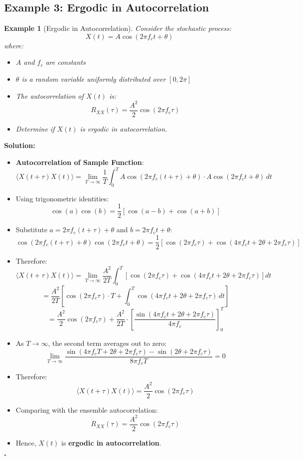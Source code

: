 \documentclass[12pt]{article}
\newtheorem{example}{Example}
\newenvironment{solution}{\noindent\textbf{Solution:}}{\hfill$\square$}
\begin{document}
\subsection{Example 3: Ergodic in Autocorrelation}
\begin{example}[Ergodic in Autocorrelation]
Consider the stochastic process:
\[
X(t) = A \cos(2\pi f_c t + \theta)
\]
where:
\begin{itemize}
    \item \( A \) and \( f_c \) are constants
    \item \( \theta \) is a random variable uniformly distributed over \( [0, 2\pi] \)
\end{itemize}
\begin{itemize}
    \item The autocorrelation of \( X(t) \) is:
    \[
    R_{XX}(\tau) = \frac{A^2}{2} \cos(2\pi f_c \tau)
    \]
    \item Determine if \( X(t) \) is ergodic in autocorrelation.
\end{itemize}
\end{example}
\begin{solution}
\begin{itemize}
    \item \textbf{Autocorrelation of Sample Function}:
    \[
    \langle X(t+\tau) X(t) \rangle = \lim_{T \to \infty} \frac{1}{T} \int_{0}^{T} A \cos(2\pi f_c (t+\tau) + \theta) \cdot A \cos(2\pi f_c t + \theta) \, dt
    \]
    \item Using trigonometric identities:
    \[
    \cos(a)\cos(b) = \frac{1}{2} [\cos(a - b) + \cos(a + b)]
    \]
    \item Substitute \( a = 2\pi f_c (t+\tau) + \theta \) and \( b = 2\pi f_c t + \theta \):
    \[
    \cos(2\pi f_c (t+\tau) + \theta) \cos(2\pi f_c t + \theta) = \frac{1}{2} \left[ \cos(2\pi f_c \tau) + \cos(4\pi f_c t + 2\theta + 2\pi f_c \tau) \right]
    \]
    \item Therefore:
    \[
    \langle X(t+\tau) X(t) \rangle = \lim_{T \to \infty} \frac{A^2}{2T} \int_{0}^{T} \left[ \cos(2\pi f_c \tau) + \cos(4\pi f_c t + 2\theta + 2\pi f_c \tau) \right] dt
    \]
    \[
    = \frac{A^2}{2T} \left[ \cos(2\pi f_c \tau) \cdot T + \int_{0}^{T} \cos(4\pi f_c t + 2\theta + 2\pi f_c \tau) \, dt \right]
    \]
    \[
    = \frac{A^2}{2} \cos(2\pi f_c \tau) + \frac{A^2}{2T} \cdot \left[ \frac{\sin(4\pi f_c t + 2\theta + 2\pi f_c \tau)}{4\pi f_c} \right]_{0}^{T}
    \]
    \item As \( T \to \infty \), the second term averages out to zero:
    \[
    \lim_{T \to \infty} \frac{\sin(4\pi f_c T + 2\theta + 2\pi f_c \tau) - \sin(2\theta + 2\pi f_c \tau)}{8\pi f_c T} = 0
    \]
    \item Therefore:
    \[
    \langle X(t+\tau) X(t) \rangle = \frac{A^2}{2} \cos(2\pi f_c \tau)
    \]
    \item Comparing with the ensemble autocorrelation:
    \[
    R_{XX}(\tau) = \frac{A^2}{2} \cos(2\pi f_c \tau)
    \]
    \item Hence, \( X(t) \) is \textbf{ergodic in autocorrelation}.
\end{itemize}
\end{solution}
\end{document}
